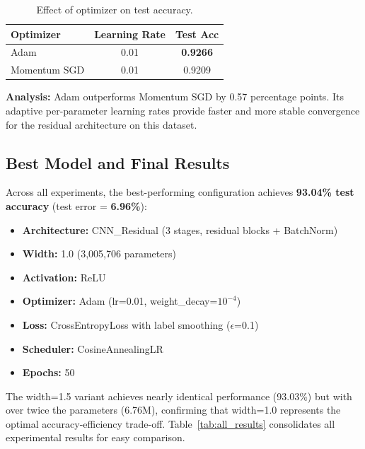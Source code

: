 \documentclass[11pt,a4paper]{article}
\begin{document}
\begin{table}[H]
\centering
\caption{Effect of optimizer on test accuracy.}
\label{tab:optimizer}
\begin{tabular}{@{}lcc@{}}
\toprule
\textbf{Optimizer} & \textbf{Learning Rate} & \textbf{Test Acc} \\
\midrule
Adam          & 0.01 & \textbf{0.9266} \\
Momentum SGD  & 0.01 & 0.9209 \\
\bottomrule
\end{tabular}
\end{table}

\textbf{Analysis:} Adam outperforms Momentum SGD by 0.57 percentage points. Its adaptive per-parameter learning rates provide faster and more stable convergence for the residual architecture on this dataset.

\subsection{Best Model and Final Results}

Across all experiments, the best-performing configuration achieves \textbf{93.04\% test accuracy} (test error = \textbf{6.96\%}):

\begin{itemize}[nosep]
    \item \textbf{Architecture:} CNN\_Residual (3 stages, residual blocks + BatchNorm)
    \item \textbf{Width:} 1.0 (3,005,706 parameters)
    \item \textbf{Activation:} ReLU
    \item \textbf{Optimizer:} Adam (lr=0.01, weight\_decay=$10^{-4}$)
    \item \textbf{Loss:} CrossEntropyLoss with label smoothing ($\epsilon$=0.1)
    \item \textbf{Scheduler:} CosineAnnealingLR
    \item \textbf{Epochs:} 50
\end{itemize}

The width=1.5 variant achieves nearly identical performance (93.03\%) but with over twice the parameters (6.76M), confirming that width=1.0 represents the optimal accuracy-efficiency trade-off. Table~\ref{tab:all_results} consolidates all experimental results for easy comparison.
\end{document}
